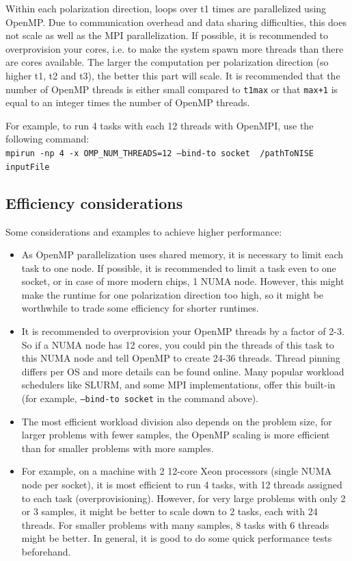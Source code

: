 \documentclass[12pt]{book}
\begin{document}
Within each polarization direction, loops over t1 times are parallelized using OpenMP. Due to communication overhead and data sharing difficulties, this does not scale as well as the MPI parallelization. If possible, it is recommended to overprovision your cores, i.e. to make the system spawn more threads than there are cores available. The larger the computation per polarization direction (so higher t1, t2 and t3), the better this part will scale. It is recommended that the number of OpenMP threads is either small compared to {\tt t1max} or that {\tt max+1} is equal to an integer times the number of OpenMP threads.

For example, to run 4 tasks with each 12 threads with OpenMPI, use the following command:\\
{\tt mpirun -np 4 -x OMP\_NUM\_THREADS=12 --bind-to socket ~/pathToNISE inputFile}

\subsection{Efficiency considerations}
Some considerations and examples to achieve higher performance:
\begin{itemize}
\item As OpenMP parallelization uses shared memory, it is necessary to limit each task to one node. If possible, it is recommended to limit a task even to one socket, or in case of more modern chips, 1 NUMA node. However, this might make the runtime for one polarization direction too high, so it might be worthwhile to trade some efficiency for shorter runtimes.
\item It is recommended to overprovision your OpenMP threads by a factor of 2-3. So if a NUMA node has 12 cores, you could pin the threads of this task to this NUMA node and tell OpenMP to create 24-36 threads. Thread pinning differs per OS and more details can be found online. Many popular workload schedulers like SLURM, and some MPI implementations, offer this built-in (for example, {\tt --bind-to socket} in the command above).
\item The most efficient workload division also depends on the problem size, for larger problems with fewer samples, the OpenMP scaling is more efficient than for smaller problems with more samples.
\item For example, on a machine with 2 12-core Xeon processors (single NUMA node per socket), it is most efficient to run 4 tasks, with 12 threads assigned to each task (overprovisioning). However, for very large problems with only 2 or 3 samples, it might be better to scale down to 2 tasks, each with 24 threads. For smaller problems with many samples, 8 tasks with 6 threads might be better. In general, it is good to do some quick performance tests beforehand.
\end{itemize}
\end{document}
